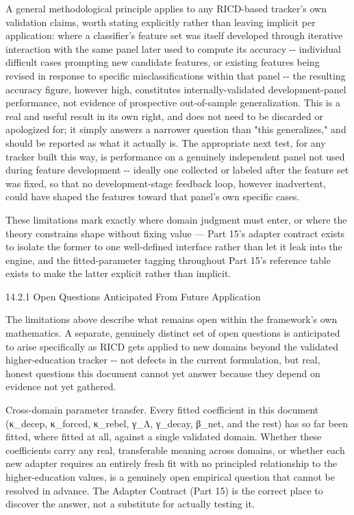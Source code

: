 \documentclass[
]{article}
\begin{document}
A general methodological principle applies to any RICD-based tracker's
own validation claims, worth stating explicitly rather than leaving
implicit per application: where a classifier's feature set was itself
developed through iterative interaction with the same panel later used
to compute its accuracy -\/- individual difficult cases prompting new
candidate features, or existing features being revised in response to
specific misclassifications within that panel -\/- the resulting
accuracy figure, however high, constitutes internally-validated
development-panel performance, not evidence of prospective out-of-sample
generalization. This is a real and useful result in its own right, and
does not need to be discarded or apologized for; it simply answers a
narrower question than "this generalizes," and should be reported as
what it actually is. The appropriate next test, for any tracker built
this way, is performance on a genuinely independent panel not used
during feature development -\/- ideally one collected or labeled after
the feature set was fixed, so that no development-stage feedback loop,
however inadvertent, could have shaped the features toward that panel's
own specific cases.

These limitations mark exactly where domain judgment must enter, or
where the theory constrains shape without fixing value --- Part 15's
adapter contract exists to isolate the former to one well-defined
interface rather than let it leak into the engine, and the
fitted-parameter tagging throughout Part 15's reference table exists to
make the latter explicit rather than implicit.

14.2.1 Open Questions Anticipated From Future Application

The limitations above describe what remains open within the framework's
own mathematics. A separate, genuinely distinct set of open questions is
anticipated to arise specifically as RICD gets applied to new domains
beyond the validated higher-education tracker -\/- not defects in the
current formulation, but real, honest questions this document cannot yet
answer because they depend on evidence not yet gathered.

Cross-domain parameter transfer. Every fitted coefficient in this
document (κ\_decep, κ\_forced, κ\_rebel, γ\_Λ, γ\_decay, β\_net, and the
rest) has so far been fitted, where fitted at all, against a single
validated domain. Whether these coefficients carry any real,
transferable meaning across domains, or whether each new adapter
requires an entirely fresh fit with no principled relationship to the
higher-education values, is a genuinely open empirical question that
cannot be resolved in advance. The Adapter Contract (Part 15) is the
correct place to discover the answer, not a substitute for actually
testing it.
\end{document}
